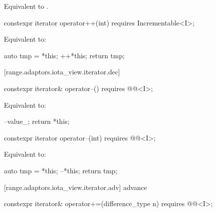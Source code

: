 {\begin{itemdescr}
\pnum
\effects Equivalent to .
\end{itemdescr}

\begin{itemdecl}
constexpr iterator operator++(int) requires Incrementable<I>;
\end{itemdecl}

\begin{itemdescr}
\pnum
\effects Equivalent to:
\begin{codeblock}
auto tmp = *this;
++*this;
return tmp;
\end{codeblock}
\end{itemdescr}

[range.adaptors.iota_view.iterator.dec]{}

\begin{itemdecl}
constexpr iterator& operator--() requires @@<I>;
\end{itemdecl}

\begin{itemdescr}
\pnum
\effects Equivalent to:
\begin{codeblock}
--value_;
return *this;
\end{codeblock}
\end{itemdescr}

\begin{itemdecl}
constexpr iterator operator--(int) requires @@<I>;
\end{itemdecl}

\begin{itemdescr}
\pnum
\effects Equivalent to:
\begin{codeblock}
auto tmp = *this;
--*this;
return tmp;
\end{codeblock}
\end{itemdescr}

[range.adaptors.iota_view.iterator.adv]{ advance}

\begin{itemdecl}
constexpr iterator& operator+=(difference_type n)
  requires @@<I>;
\end{itemdecl}

}
